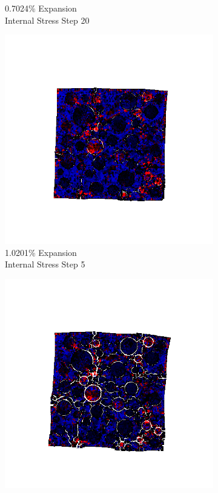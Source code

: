 \begin{figure}[ht!]
\begin{subfigure}{.25\textwidth}
      \caption{0.7024\% Expansion\\Internal Stress Step 20}
    \end{subfigure}

    \begin{subfigure}{.25\textwidth}
      \centering
      \includegraphics[width=1.0\linewidth]{Files/exp_3D/ASR/A30P25_4_s5.png}
      \caption{1.0201\% Expansion\\Internal Stress Step 5}
    \end{subfigure}%
    \begin{subfigure}{.25\textwidth}
      \centering
      \includegraphics[width=1.0\linewidth]{Files/exp_3D/ASR/A30P25_4_s10.png}

\end{subfigure}
\end{figure}
